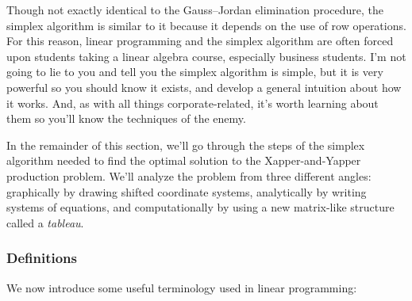 \documentclass[11pt,oneside]{article}
\begin{document}
	
	\noindent
	Though not exactly identical to the Gauss--Jordan elimination procedure,
	the simplex algorithm is similar to it because it depends on the use of row operations.
	For this reason, linear programming and the simplex algorithm are often forced upon
	students taking a linear algebra course, especially business students.	
	I'm not going to lie to you and tell you the simplex algorithm is simple,
	but it is very powerful so you should know it exists, 
	and develop a general intuition about how it works.
	And, as with all things corporate-related,
	it's worth learning about them so you'll know the techniques of the enemy.

	In the remainder of this section, we'll go through the steps of the simplex algorithm 
	needed to find the optimal solution to the Xapper-and-Yapper production problem.
	We'll analyze the problem from three different angles: 
	graphically by drawing shifted coordinate systems,
	analytically by writing systems of equations, 
	and computationally by using a new matrix-like structure called a \emph{tableau}.
	
	
	\subsubsection{Definitions}
		
		We now introduce some useful terminology used in linear programming:
		
\end{document}
